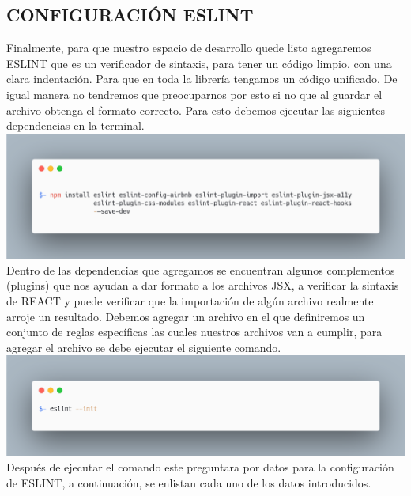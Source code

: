 \subsection{CONFIGURACIÓN ESLINT }
Finalmente, para que nuestro espacio de desarrollo quede listo agregaremos ESLINT que es un verificador de sintaxis, para tener un código limpio, con una clara indentación. Para que en toda la librería tengamos un código unificado. De igual manera no tendremos que preocuparnos por esto si no que al guardar el archivo obtenga el formato correcto.
Para esto debemos ejecutar las siguientes dependencias en la terminal.
\newline
\newline
\includegraphics[width=1\textwidth]{./Imagenes/image14.png}
\newline
\newline
Dentro de las dependencias que agregamos se encuentran algunos complementos (plugins) que nos ayudan a dar formato a los archivos JSX, a verificar la sintaxis de REACT y  puede verificar que la importación de algún archivo realmente arroje un resultado.
Debemos agregar un archivo en el que definiremos un conjunto de reglas específicas las cuales nuestros archivos van a cumplir, para agregar el archivo se debe ejecutar el siguiente comando.
\newline
\newline
\includegraphics[width=1\textwidth]{./Imagenes/image32.png}
\newline
\newline
Después de ejecutar el comando este preguntara por datos para la configuración de ESLINT, a continuación, se enlistan cada uno de los datos introducidos.
